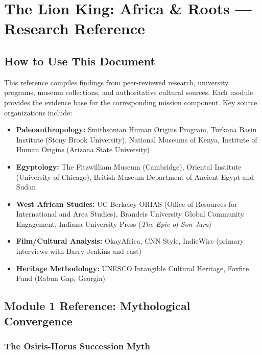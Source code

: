 \documentclass[11pt,letterpaper]{article}
\newcommand{\stageheader}[2]{%
  \noindent\colorbox{#2}{\makebox[\textwidth][l]{%
    \textcolor{white}{\bfseries\sffamily\hspace{6pt}#1\hspace{6pt}}}}%
  \vspace{0.5em}\par%
}
\begin{document}
\newpage

\stageheader{STAGE 2 --- RESEARCH REFERENCE}{secondary}

\section{The Lion King: Africa \& Roots --- Research Reference}

\subsection{How to Use This Document}

This reference compiles findings from peer-reviewed research, university programs, museum collections, and authoritative cultural sources. Each module provides the evidence base for the corresponding mission component. Key source organizations include:

\begin{itemize}[leftmargin=2em]
  \item \textbf{Paleoanthropology:} Smithsonian Human Origins Program, Turkana Basin Institute (Stony Brook University), National Museums of Kenya, Institute of Human Origins (Arizona State University)
  \item \textbf{Egyptology:} The Fitzwilliam Museum (Cambridge), Oriental Institute (University of Chicago), British Museum Department of Ancient Egypt and Sudan
  \item \textbf{West African Studies:} UC Berkeley ORIAS (Office of Resources for International and Area Studies), Brandeis University Global Community Engagement, Indiana University Press (\textit{The Epic of Son-Jara})
  \item \textbf{Film/Cultural Analysis:} OkayAfrica, CNN Style, IndieWire (primary interviews with Barry Jenkins and cast)
  \item \textbf{Heritage Methodology:} UNESCO Intangible Cultural Heritage, Foxfire Fund (Rabun Gap, Georgia)
\end{itemize}

\subsection{Module 1 Reference: Mythological Convergence}

\subsubsection{The Osiris-Horus Succession Myth}
\end{document}
